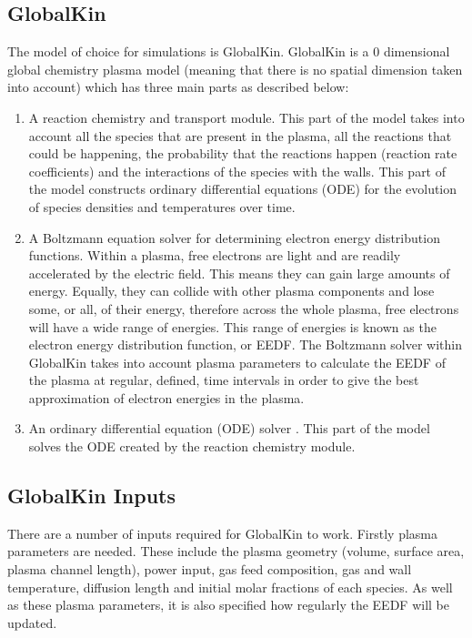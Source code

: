\documentclass[11pt, oneside]{article}   	%
\begin{document}
\subsection{GlobalKin}
The model of choice for simulations is GlobalKin.
GlobalKin is a 0 dimensional global chemistry plasma model (meaning that there is no spatial dimension taken into account) which has three main parts as described below:
\begin{enumerate}
\item A reaction chemistry and transport module. 
This part of the model takes into account all the species that are present in the plasma, all the reactions that could be happening, the probability that the reactions happen (reaction rate coefficients) and the interactions of the species with the walls. 
This part of the model constructs ordinary differential equations (ODE) for the evolution of species densities and temperatures over time.
\item A Boltzmann equation solver for determining electron energy distribution functions. 
Within a plasma, free electrons are light and are readily accelerated by the electric field. 
This means they can gain large amounts of energy.
Equally, they can collide with other plasma components and lose some, or all, of their energy, therefore across the whole plasma, free electrons will have a wide range of energies.
This range of energies is known as the electron energy distribution function, or EEDF.
The Boltzmann solver within GlobalKin takes into account plasma parameters to calculate the EEDF of the plasma at regular, defined, time intervals in order to give the best approximation of electron energies in the plasma.
\item An ordinary differential equation (ODE) solver \cite{Stafford2004O2}.
This part of the model solves the ODE created by the reaction chemistry module.
\end{enumerate}


\subsection{GlobalKin Inputs}
There are a number of inputs required for GlobalKin to work.
Firstly plasma parameters are needed.
These include the plasma geometry (volume, surface area, plasma channel length), power input, gas feed composition, gas and wall temperature, diffusion length and initial molar fractions of each species.
As well as these plasma parameters, it is also specified how regularly the EEDF will be updated.
\end{document}
